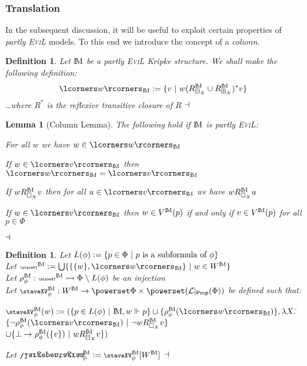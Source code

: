 \documentclass[11pt]{article}
\numberwithin{equation}{subsection}
\newtheorem{mydef}[theorem]{Definition}
\newtheorem{lemma}[theorem]{Lemma}
\newcommand{\bs}{\ensuremath{\backslash}}
\renewcommand{\Cross}{\textrm{\ding{61}}}
\newcommand{\iCross}{\mathrel{\reflectbox{\rotatebox[origin=c]{180}{\textrm{\ding{61}}}}}\!}
\newcommand{\ipent}{\mathrel{\reflectbox{\rotatebox[origin=c]{180}{\ensuremath{\largepentagram}}}}\!\!\!}
\newcommand{\ang}{\textrm{\tiny{\staveVI}}}
\newcommand{\Nec}{\Box}
\newcommand{\BB}{\boxminus}
\newcommand{\BBI}{\boxplus}
\newcommand{\invis}{\mathrel{\reflectbox{\rotatebox[origin=c]{180}{\textrm{\ding{61}}}}}\!}
\newcommand{\Kill}{\textrm{\footnotesize{\staveXV}}}
\begin{document}
\subsubsection{Translation}

In the subsequent discussion, it will be useful to exploit certain properties of \emph{partly \textsc{EviL}} models.  To this end we introduce the concept of a \emph{column}.

\begin{mydef}Let $\bbM$ be a partly \textsc{EviL} Kripke structure.  We shall make the following definition:
\[ \lcorners w\rcorners_\bbM := \{ v\ |\ w (R^{\bbM}_{\BB_X}\cup R^{\bbM}_{\BBI_X})^\ast v \}\]
\ldots where $R^\ast$ is the reflexive transitive closure of $R$
$\hfill\dashv$\end{mydef}

\begin{lemma}[Column Lemma]\label{column}
The following hold if $\bbM$ is partly \textsc{EviL}:
\begin{mynum}
	\item For all $w$ we have $w \in \lcorners w\rcorners_\bbM$
	\item If $w \in \lcorners v\rcorners_\bbM$ then $\lcorners w\rcorners_\bbM = \lcorners v\rcorners_\bbM$
	\item If $w R^\bbM_{\Nec_X} v$ then for all $u \in \lcorners v\rcorners_\bbM$ we have $w R^\bbM_{\Nec_X} u$
	\item If $w \in \lcorners v\rcorners_\bbM$ then $w\in V^\bbM(p)$ if and only if $v \in V^\bbM(p)$ for all $p \in \Phi$
\end{mynum}
$\hfill\dashv$
\end{lemma}

\begin{mydef}
 Let $L(\phi) := \{ p \in \Phi \ |\ p \textup{ is a subformula of } \phi\}$
\\ Let $\ang^\bbM := \bigcup \{\{\{w\}, \lcorners w\rcorners_\bbM\} \ |\ w \in W^\bbM\}$
\\ Let $\rho_\phi^\bbM: \ang^\bbM \rightarrowtail \Phi \; \bs\; L(\phi)$ be an injection
\\ Let $\Kill_\phi^\bbM : W^\bbM \to \powerset \Phi \times \powerset(\mathcal{L}|_\textsf{Prop}(\Phi))$ be defined such that:
\begin{center}
\begin{minipage}{3in}
\begin{tabbing}
$\Kill_\phi^\bbM(w) := (\{p \in L(\phi) \ |\ \bbM,w\Vdash p\} \cup \{\rho^\bbM_\phi(\lcorners w\rcorners_\bbM)\},\lambda X.$\= $\{\neg \rho^\bbM_\phi(\lcorners v\rcorners_\bbM) \ |\ \neg w R^\bbM_{\Nec_X} v\}$\\
\> $\cup \{\bot \to \rho^\bbM_\phi(\{v\}) \ |\ w R^\bbM_{\BB_X} v\})$
\end{tabbing}
\end{minipage}
\end{center}
Let $\ipent^\bbM_\phi := \Kill_\phi^\bbM[W^\bbM]$
$\hfill\dashv$
\end{mydef}
\end{document}
